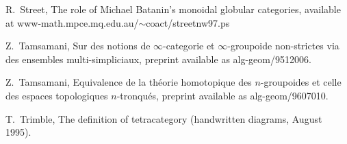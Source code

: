 \begin{thebibliography}{10}

 R.\ Street, The role of Michael Batanin's monoidal
globular categories, available at 
www-math.mpce.mq.edu.au/$\sim$coact/street\underline{\hbox{\hspace{0.5em}}}nw97.ps

 Z.\ Tamsamani, Sur des notions de
$\infty$-categorie et $\infty$-groupoide non-strictes via des
ensembles multi-simpliciaux, preprint available as
alg-geom/9512006.

 Z.\ Tamsamani, Equivalence de la th\'eorie
homotopique des $n$-groupoides et celle des espaces 
topologiques $n$-tronqu\'es, preprint available as 
alg-geom/9607010.

 T.\ Trimble, The definition of tetracategory
(handwritten diagrams, August 1995).

\end{thebibliography}


